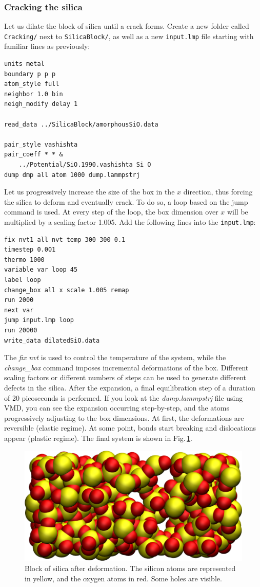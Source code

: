 \documentclass[9pt,tutorial]{livecoms}
\newcommand{\flrcmd}[1]{\textcolor{command}{\texttt{#1}}} %
\newcommand{\flecmd}[1]{\textcolor{command}{\texttt{#1}}} %
\begin{document}
\subsubsection{Cracking the silica}
Let us dilate the block of silica until a crack forms. Create a new folder
called \flrcmd{Cracking/} next to \flrcmd{SilicaBlock/}, as well as a new
\flecmd{input.lmp} file starting with familiar lines as previously:
\begin{lstlisting}
units metal
boundary p p p
atom_style full
neighbor 1.0 bin
neigh_modify delay 1

read_data ../SilicaBlock/amorphousSiO.data

pair_style vashishta
pair_coeff * * &
    ../Potential/SiO.1990.vashishta Si O
dump dmp all atom 1000 dump.lammpstrj
\end{lstlisting}
Let us progressively increase the size of the box in the $x$ direction, thus forcing
the silica to deform and eventually crack. To do so, a loop based on the jump command
is used. At every step of the loop, the box dimension over $x$ will be multiplied
by a scaling factor 1.005. Add the following lines into the \flecmd{input.lmp}:
\begin{lstlisting}
fix nvt1 all nvt temp 300 300 0.1
timestep 0.001
thermo 1000
variable var loop 45
label loop
change_box all x scale 1.005 remap
run 2000
next var
jump input.lmp loop
run 20000
write_data dilatedSiO.data
\end{lstlisting}
The \textit{fix nvt} is used to control the temperature of the system, while the
\textit{change\_box} command imposes incremental deformations of the box. Different
scaling factors or different numbers of steps can be used to generate different
defects in the silica. After the expansion, a final equilibration step of a duration
of 20 picoseconds is performed. If you look at the \textit{dump.lammpstrj} file
using VMD, you can see the expansion occurring step-by-step, and the atoms
progressively adjusting to the box dimensions. At first, the deformations are
reversible (elastic regime). At some point, bonds start breaking and dislocations
appear (plastic regime). The final system is shown in Fig.\,\ref{fig:GCMC-cracked}.

\begin{figure}
\centering
\includegraphics[width=\linewidth]{GCMC-cracked}
\caption{Block of silica after deformation. The silicon atoms are represented in
yellow, and the oxygen atoms in red. Some holes are visible.}
\label{fig:GCMC-cracked}
\end{figure}
\end{document}

